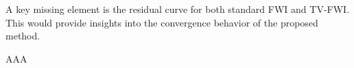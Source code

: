 \begin{point}
	A key missing element is the residual curve  for both standard FWI and TV-FWI. This would provide insights into the convergence behavior of the proposed method.
\end{point}

\begin{reply}
	AAA
\end{reply}

